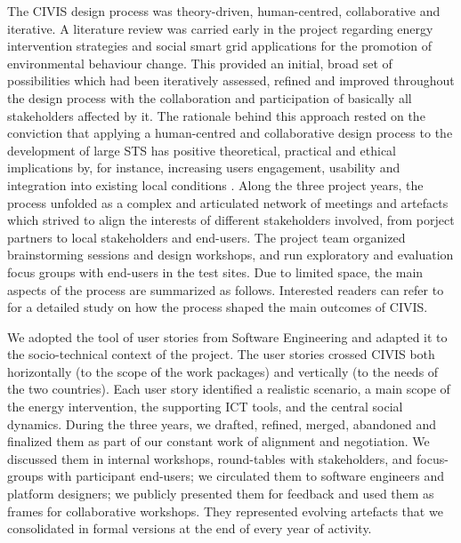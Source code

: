 The CIVIS design process was theory-driven, human-centred, collaborative and iterative. A
literature review was carried early in the project regarding energy intervention strategies and social smart
grid applications for the promotion of environmental behaviour change. This provided an initial, broad set
of possibilities which had been iteratively assessed, refined and improved throughout the design process with the collaboration and participation of basically all stakeholders affected by it.
% 
The rationale behind this approach rested on the conviction that applying a human-centred and
collaborative design process to the development of large STS has positive
theoretical, practical and ethical implications \cite{Greenbaum1993,Boedker2004} by, for instance, increasing users engagement,
usability and integration into existing local conditions \cite{Brynjarsdottir2012,Dick2012,Pierce2012}.
% 
Along the three project years, the process unfolded as a complex and articulated network of meetings and artefacts
which strived to align the interests of different stakeholders involved, from porject partners to
local stakeholders and end-users. The project team organized brainstorming sessions and design workshops, and run exploratory and evaluation focus groups with end-users in the test sites.
Due to limited space, the main aspects of the process are summarized as follows. Interested readers can refer to
\cite{poderi_disentangling_2017} for a detailed study on how the process shaped the main
outcomes of CIVIS. %


We adopted the tool of user stories \cite{Kankainen2012} from Software Engineering and adapted it to the socio-technical context of the project. The user stories crossed CIVIS both horizontally (to the
scope of the work packages) and vertically (to the needs of the two countries). Each user
story identified a realistic scenario, a main scope of the energy intervention, the supporting ICT tools,
and the central social dynamics. During the three years, we drafted, refined, merged, abandoned and
finalized them as part of our constant work of alignment and negotiation. We discussed them in internal
workshops, round-tables with stakeholders, and focus-groups with participant end-users; we circulated
them to software engineers and platform designers; we publicly presented them for feedback and used them
as frames for collaborative workshops. They represented evolving artefacts that we consolidated in formal
versions at the end of every year of activity. 

